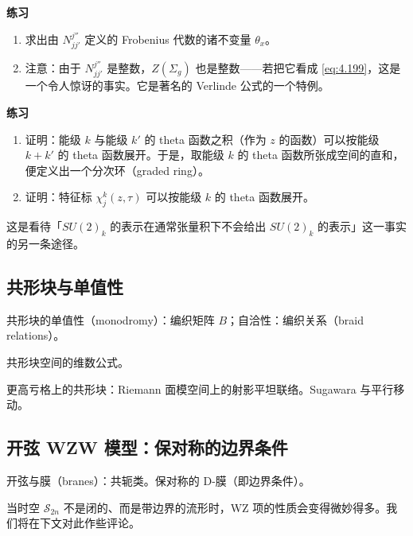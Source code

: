 \textbf{练习}
\begin{enumerate}[label=\alph*.)]
  \item 求出由 $N^{j''}_{jj'}$ 定义的 Frobenius 代数的诸不变量 $\theta_x$。
  \item 注意：由于 $N^{j''}_{jj'}$ 是整数，$Z(\Sigma_g)$ 也是整数——若把它看成 \eqref{eq:4.199}，这是一个令人惊讶的事实。它是著名的 Verlinde 公式的一个特例。
\end{enumerate}


\textbf{练习}
\begin{enumerate}[label=\alph*.)]
  \item 证明：能级 $k$ 与能级 $k'$ 的 theta 函数之积（作为 $z$ 的函数）可以按能级 $k+k'$ 的 theta 函数展开。于是，取能级 $k$ 的 theta 函数所张成空间的直和，便定义出一个分次环（graded ring）。
  \item 证明：特征标 $\chi^k_j(z,\tau)$ 可以按能级 $k$ 的 theta 函数展开。
\end{enumerate}

这是看待「$SU(2)_k$ 的表示在通常张量积下不会给出 $SU(2)_k$ 的表示」这一事实的另一条途径。

\subsection{共形块与单值性} %

共形块的单值性（monodromy）：编织矩阵 $B$；自洽性：编织关系（braid relations）。

共形块空间的维数公式。

更高亏格上的共形块：Riemann 面模空间上的射影平坦联络。Sugawara 与平行移动。

\subsection{开弦 WZW 模型：保对称的边界条件} %

开弦与膜（branes）：共轭类。保对称的 D-膜（即边界条件）。

当时空 $\mathcal{S}_{2n}$ 不是闭的、而是带边界的流形时，WZ 项的性质会变得微妙得多。我们将在下文对此作些评论。

